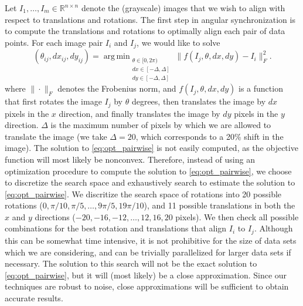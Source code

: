 \documentclass[twocolumn, 11pt]{article}
\DeclareMathOperator*{\argmin}{arg\,min}
\begin{document}
Let $I_1, \dots, I_m \in \mathbb{R}^{n \times n}$ denote the (grayscale) images that we wish to align with respect to translations and rotations.
%
The first step in angular synchronization is to compute the translations and rotations to optimally align each pair of data points. 
%
For each image pair $I_i$ and $I_j$, we would like to solve
\begin{equation}\label{eq:opt_pairwise}
(\theta_{ij}, dx_{ij}, dy_{ij}) = \argmin_{
\begin{matrix}
\theta \in [0, 2\pi) \\ 
dx \in [-\Delta, \Delta]\\ 
dy \in [-\Delta, \Delta]
\end{matrix}
} \|f(I_j, \theta, dx, dy) - I_i \|_F^2.
\end{equation}
where $\| \cdot \|_F$ denotes the Frobenius norm, and $f(I_j, \theta, dx, dy)$ is a function that first rotates the image $I_j$ by $\theta$ degrees, then translates the image by $dx$ pixels in the $x$ direction, and finally translates the image by $dy$ pixels in the $y$ direction. 
%
$\Delta$ is the maximum number of pixels by which we are allowed to translate the image (we take $\Delta=20$, which corresponds to a 20\% shift in the image). 
%
The solution to \eqref{eq:opt_pairwise} is not easily computed, as the objective function will most likely be nonconvex.
%
Therefore, instead of using an optimization procedure to compute the solution to \eqref{eq:opt_pairwise}, we choose to discretize the search space and exhaustively search to estimate the solution to \eqref{eq:opt_pairwise}.
%
We discritize the search space of rotations into 20 possible rotations ($0, \pi/10, \pi/5, \dots, 9 \pi/5, 19\pi/10$), and 11 possible translations in both the $x$ and $y$ directions ($-20, -16, -12, \dots, 12, 16, 20$ pixels). 
%
We then check all possible combinations for the best rotation and translations that align $I_i$ to $I_j$. 
%
Although this can be somewhat time intensive, it is not prohibitive for the size of data sets which we are considering, and can be trivially parallelized for larger data sets if necessary.
%
The solution to this search will not be the exact solution to \eqref{eq:opt_pairwise}, but it will (most likely) be a close approximation.
%
Since our techniques are robust to noise, close approximations will be sufficient to obtain accurate results.
\end{document}

